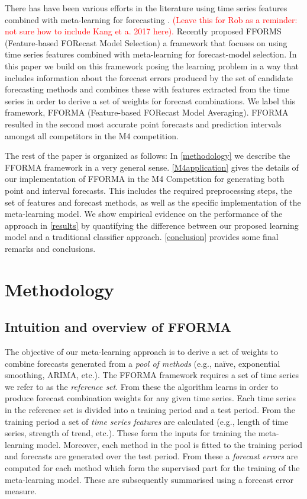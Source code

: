 \documentclass[11pt,a4paper,]{article}
\def\naive{na\"{i}ve}
\theoremstyle{definition}
\theoremstyle{definition}
\theoremstyle{definition}
\theoremstyle{remark}
\begin{document}
There has have been various efforts in the literature using time series
features combined with meta-learning for forecasting \autocites[see for
example][]{prudencio2004using}{LEMKE20102006}{KucEtAl2016}.
\textcolor{red}{(Leave this for Rob as a reminder: not sure how to include Kang et a. 2017 here).}
Recently \textcite{fforms} proposed FFORMS (Feature-based FORecast Model
Selection) a framework that focuses on using time series features
combined with meta-learning for forecast-model selection. In this paper
we build on this framework posing the learning problem in a way that
includes information about the forecast errors produced by the set of
candidate forecasting methods and combines these with features extracted
from the time series in order to derive a set of weights for forecast
combinations. We label this framework, FFORMA (Feature-based FORecast
Model Averaging). FFORMA resulted in the second most accurate point
forecasts and prediction intervals amongst all competitors in the M4
competition.

The rest of the paper is organized as follows: In \autoref{methodology}
we describe the FFORMA framework in a very general sense.
\autoref{M4application} gives the details of our implementation of
FFORMA in the M4 Competition for generating both point and interval
forecasts. This includes the required preprocessing steps, the set of
features and forecast methods, as well as the specific implementation of
the meta-learning model. We show empirical evidence on the performance
of the approach in \autoref{results} by quantifying the difference
between our proposed learning model and a traditional classifier
approach. \autoref{conclusion} provides some final remarks and
conclusions.

\section{Methodology}\label{methodology}

\subsection{Intuition and overview of
FFORMA}\label{intuition-and-overview-of-fforma}

The objective of our meta-learning approach is to derive a set of
weights to combine forecasts generated from a \emph{pool of methods}
(e.g., \naive, exponential smoothing, ARIMA, etc.). The FFORMA framework
requires a set of time series we refer to as the \emph{reference set}.
From these the algorithm learns in order to produce forecast combination
weights for any given time series. Each time series in the reference set
is divided into a training period and a test period. From the training
period a set of \emph{time series features} are calculated (e.g., length
of time series, strength of trend, etc.). These form the inputs for
training the meta-learning model. Moreover, each method in the pool is
fitted to the training period and forecasts are generated over the test
period. From these a \emph{forecast errors} are computed for each method
which form the supervised part for the training of the meta-learning
model. These are subsequently summarised using a forecast error measure.
\end{document}
